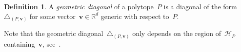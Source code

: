 \documentclass{amsart}
\newcommand{\darkblue}{\color{darkblue}} %
\theoremstyle{definition}
\newtheorem{definition}[theorem]{Definition}
\newcommand{\R}{\mathbb{R}} %
\renewcommand{\b}[1]{{\boldsymbol{#1}}} %
\newcommand{\defn}[1]{\textsl{\darkblue #1}} %
\renewcommand{\b}[1]{\boldsymbol{#1}} %
\begin{document}
\begin{definition}
\label{def:geometricDiagonal}
A \defn{geometric diagonal} of a polytope~$P$ is a diagonal of the form~$\triangle_{(P,\b{v})}$ for some vector~$\b{v} \in \R^d$ generic with respect to~$P$.
\end{definition}

Note that the geometric diagonal~$\triangle_{(P,\b{v})}$ only depends on the region of~$\mathcal{H}_P$ containing~$\b{v}$, see~\cite[Prop.~1.23]{LaplanteAnfossi}.

\begin{figure}[p]
	\centerline{}
\end{figure}
\end{document}
